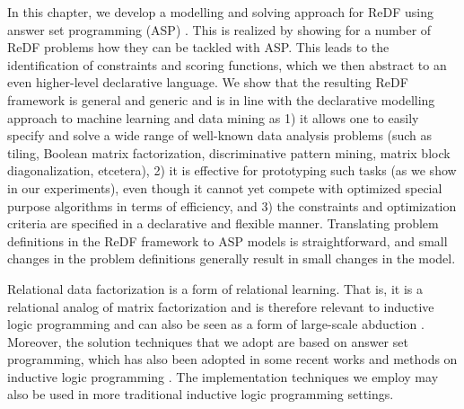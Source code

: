 In this chapter, we develop a modelling and solving approach for ReDF using answer set programming (ASP) \parencite{BrewkaCACM}. This is realized by showing for a number of ReDF problems how they can be tackled with ASP.  
This leads to the identification of constraints and scoring functions, which we then abstract to an even higher-level declarative language. 
We show that the resulting ReDF framework is general and generic and is in line with 
  the declarative modelling approach to machine learning and data mining as 
  1) it allows one to easily specify and solve a wide range of well-known data analysis problems (such as tiling, Boolean matrix factorization, discriminative pattern mining, matrix block diagonalization, etcetera),
  2) it is effective for prototyping such tasks (as we show in our experiments), even though it cannot yet compete with optimized special purpose algorithms in terms of efficiency, and 
  3) the constraints and optimization criteria are specified in a declarative and flexible manner. 
  Translating problem definitions in the ReDF framework to ASP models is straightforward, and small changes in the problem definitions generally result in small changes in the model. 
%

  Relational data factorization is a form of relational learning. That is, it is a relational analog of matrix factorization and is therefore relevant to inductive logic programming \parencite{ilp_theory_methods,luc_book} and can also be seen as a form of large-scale abduction \parencite{abduction}. Moreover, the solution techniques that we adopt are based on answer set programming, which has also been adopted in some recent works and methods on inductive logic programming \parencite{ilp_graph_mining,DBLP:conf/lpnmr/Jarvisalo11}. The implementation techniques we employ may also be used in more traditional inductive logic programming settings.

